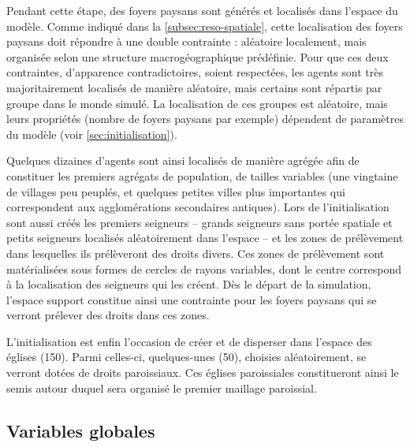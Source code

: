 \begin{tcolorbox}[breakable,left=0pt,right=0pt,top=0pt,bottom=0pt,
	colback=gray!15,colframe=gray!15,width=\dimexpr\textwidth\relax, 
	enlarge left by=0mm, boxsep=5pt,arc=0pt,outer arc=0pt]
Pendant cette étape, des foyers paysans sont générés et localisés dans l'espace du modèle.
Comme indiqué dans la \cref{subsec:reso-spatiale}, cette localisation des foyers paysans doit répondre à une double contrainte : aléatoire localement, mais organisée selon une structure macrogéographique prédéfinie.
Pour que ces deux contraintes, d'apparence contradictoires, soient respectées, les agents sont très majoritairement localisés de manière aléatoire, mais certains sont répartis \og par groupe\fg{} dans le monde simulé.
La localisation de ces groupes est aléatoire, mais leurs propriétés (nombre de foyers paysans par exemple) dépendent de paramètres du modèle (voir \cref{sec:initialisation}).

\medskip
Quelques dizaines d'agents sont ainsi localisés de manière agrégée afin de constituer les premiers agrégats de population, de tailles variables (une vingtaine de villages peu peuplés, et quelques petites villes plus importantes qui correspondent aux agglomérations secondaires antiques).
Lors de l'initialisation sont aussi créés les premiers seigneurs -- grands seigneurs sans portée spatiale et petits seigneurs localisés aléatoirement dans l'espace -- et les zones de prélèvement dans lesquelles ils prélèveront des droits divers.
Ces zones de prélèvement sont matérialisées sous formes de cercles de rayons variables, dont le centre correspond à la localisation des seigneurs qui les créent.
Dès le départ de la simulation, l'espace support constitue ainsi une contrainte pour les foyers paysans qui se verront prélever des droits dans ces zones.

L'initialisation est enfin l'occasion de créer et de disperser dans l'espace des églises (150).
Parmi celles-ci, quelques-unes (50), choisies aléatoirement, se verront dotées de droits paroissiaux.
Ces églises paroissiales constitueront ainsi le semis autour duquel sera organisé le premier maillage paroissial.
\end{tcolorbox}

\subsection{Variables globales \label{meca-variables}}


